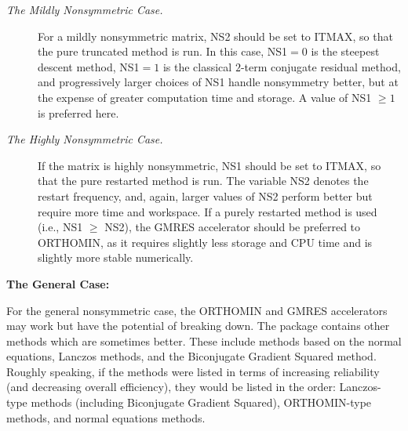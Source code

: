 \begin{description} 

\item[{\sl The Mildly Nonsymmetric Case.}]
For a mildly nonsymmetric matrix, NS2 should be set to ITMAX, so that 
the pure truncated method is run.  In this case, NS1$=0$ is the 
steepest descent method, NS1$=1$ is the classical $2$-term conjugate 
residual method, and progressively larger choices of NS1 handle 
nonsymmetry better, but at the expense of greater computation time 
and storage.  A value of NS1 $\geq 1$ is preferred here.

\item[{\sl The Highly Nonsymmetric Case.}]
If the matrix is highly nonsymmetric, NS1 should be set to ITMAX, 
so that the pure restarted method is run.  The variable NS2 denotes 
the restart frequency, and, again, larger values of NS2 perform better 
but require more time and workspace.  If a purely restarted method is 
used (i.e., NS1 $\geq$ NS2), the GMRES accelerator should be preferred 
to ORTHOMIN, as it requires slightly less storage and CPU time and is 
slightly more stable numerically.
\end{description}
 
\bigskip
\noindent
{\bf The General Case:}
\bigskip

For the general nonsymmetric case, the ORTHOMIN and GMRES accelerators
may work but have the potential of breaking down.  The package contains
other methods which are sometimes better.  These include methods
based on the normal equations, Lanczos methods, and the 
Biconjugate Gradient Squared method.  Roughly speaking, if the methods
were listed in terms of increasing reliability (and decreasing overall
efficiency), they would be listed in the order: Lanczos-type methods
(including Biconjugate Gradient Squared), ORTHOMIN-type methods,
and normal equations methods.

